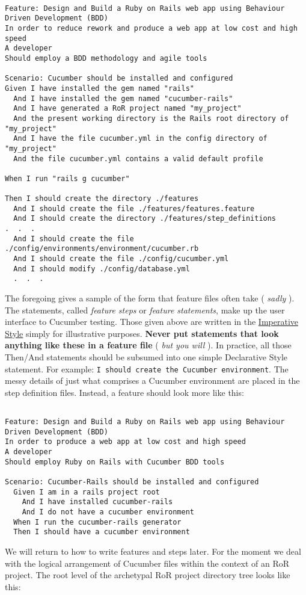 \begin{verbatim}

Feature: Design and Build a Ruby on Rails web app using Behaviour Driven Development (BDD)
In order to reduce rework and produce a web app at low cost and high speed
A developer 
Should employ a BDD methodology and agile tools

Scenario: Cucumber should be installed and configured
Given I have installed the gem named "rails"
  And I have installed the gem named "cucumber-rails"
  And I have generated a RoR project named "my_project"
  And the present working directory is the Rails root directory of "my_project"
  And I have the file cucumber.yml in the config directory of "my_project"
  And the file cucumber.yml contains a valid default profile

When I run "rails g cucumber"

Then I should create the directory ./features
  And I should create the file ./features/features.feature
  And I should create the directory ./features/step_definitions
.  .  .
  And I should create the file ./config/environments/environment/cucumber.rb
  And I should create the file ./config/cucumber.yml
  And I should modify ./config/database.yml
  .  .  .

\end{verbatim}
The foregoing gives a sample of the form that feature files often take ( \emph{sadly} ).  The statements, called \emph{feature steps} or \emph{feature statements}, make up the user interface to Cucumber testing.  Those given above are written in the \href{http://www.benmabey.com/2008/05/19/imperative-vs-declarative-scenarios-in-user-stories/}{Imperative Style} simply for illustrative purposes.  \textbf{Never put statements that look anything like these in a feature file} ( \emph{but you will} ).  In practice, all those Then/And statements should be subsumed into one simple Declarative Style statement. For example: \verb+I should create the Cucumber environment+. The messy details of just what comprises a Cucumber environment are placed in the step definition files.  Instead, a feature should look more like this:

\begin{verbatim}

Feature: Design and Build a Ruby on Rails web app using Behaviour Driven Development (BDD)
In order to produce a web app at low cost and high speed
A developer 
Should employ Ruby on Rails with Cucumber BDD tools

Scenario: Cucumber-Rails should be installed and configured
  Given I am in a rails project root
    And I have installed cucumber-rails
    And I do not have a cucumber environment
  When I run the cucumber-rails generator
  Then I should have a cucumber environment

\end{verbatim}
We will return to how to write features and steps later.  For the moment we deal with the logical arrangement of Cucumber files within the context of an RoR project.  The root level of the archetypal RoR project directory tree looks like this:

